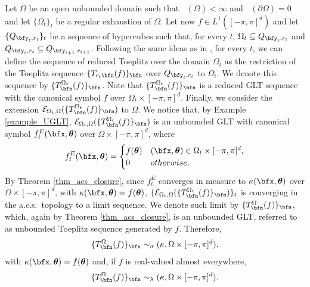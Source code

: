 \documentclass{amsart}
\DeclareMathOperator{\Ld}{\mathcal{L}^d}
\newcommand{\bftheta}{{\boldsymbol\theta}}
\begin{document}
Let $\Omega$ be an open unbounded domain such that $\Ld(\Omega) < \infty$ and $\Ld(\partial \Omega) =0$ and let $\{\Omega_t\}_t$ be a regular exhaustion of $\Omega$. Let now $f \in L^{1}([-\pi,\pi]^d)$ and let $\{Q_{{\bfy}_t,r_t}\}_t$ be a sequence of hypercubes such that, for every $t$, $ \Omega_t \subseteq Q_{{\bfy}_t,r_t}$ and $Q_{{\bfy_{t}},r_t} \subseteq Q_{{\bfy}_{t+1},r_{t+1}}$. Following the same ideas as in \cite{Barb}, for every $t$, we can define the sequence of reduced Toeplitz over the domain $\Omega_t$ as the restriction of the Toeplitz sequence $\{T_{r_t\bfn}(f)\}_{\bfn}$ over $Q_{{\bfy}_t,r_t}$ to $\Omega_t$. We denote this sequence by $\{T_{\bfn}^{\Omega_t}(f)\}_{\bfn}$. Note that $\{T_{\bfn}^{\Omega_t}(f)\}_{\bfn}$ is a reduced GLT sequence with the canonical symbol $f$ over $\Omega_t \times [-\pi,\pi]^d$. Finally, we consider the extension $\mathcal{E}_{\Omega_t, \Omega}( \{T_{\bfn}^{\Omega_t}(f)\}_\bfn)$ to $\Omega$. We notice that, by Example \ref{example_UGLT}, $\mathcal{E}_{\Omega_t,\Omega}(\{T_{\bfn}^{\Omega_t} (f)\}_{\bfn})$ is an unbounded GLT with canonical symbol $f_t^{E}(\bfx,\bftheta)$ over $\Omega \times [-\pi,\pi]^d$, where
\begin{equation*}
    f_t^{E}(\bfx,\bftheta) = \begin{cases}
      f(\bftheta) & (\bfx,\bftheta) \in \Omega_t \times [-\pi,\pi]^d,\\
      0 & otherwise.
    \end{cases}
\end{equation*}
By Theorem \ref{thm_acs_closure}, since $f_t^{E}$ converges in measure to $\kappa(\bfx,\bftheta)$ over $\Omega \times [-\pi,\pi]^d$, with $\kappa(\bfx,\bftheta)=f(\bftheta)$, $\{ \mathcal{E}_{\Omega_t,\Omega}(\{T_{\bfn}^{\Omega_t}(f)\}_{\bfn})\}_t$ is converging in the a.c.s.\ topology to a limit sequence. We denote such limit by $\{T_{\bfn}^{\Omega}(f)\}_{\bfn}$, which, again by Theorem \ref{thm_acs_closure}, is an unbounded GLT, referred to as unbounded Toeplitz sequence generated by $f$. Therefore,
\begin{equation*}
    \{T_{\bfn}^{\Omega}(f)\}_{\bfn} \sim_{\sigma} (\kappa, \Omega \times [-\pi,\pi]^d),
\end{equation*}
with $\kappa(\bfx,\bftheta)=f(\bftheta)$ and, if $f$ is real-valued almost everywhere,
\begin{equation*}
    \{T_{\bfn}^{\Omega}(f)\}_{\bfn} \sim_{\lambda} (\kappa, \Omega \times [-\pi,\pi]^d).
\end{equation*}
\end{document}
